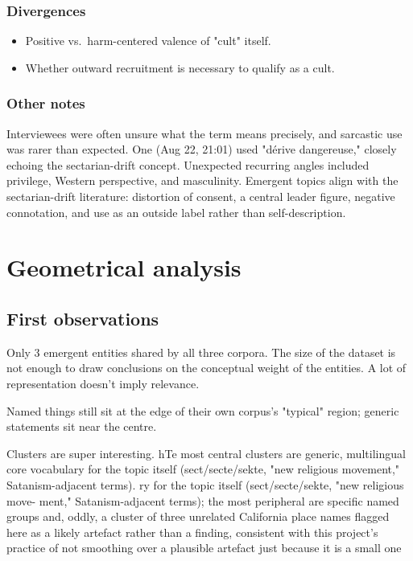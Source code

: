 \subsubsection{Divergences}
\begin{itemize}
  \item Positive vs.\ harm-centered valence of "cult" itself.
  \item Whether outward recruitment is necessary to qualify as a cult.
\end{itemize}

\subsubsection{Other notes}
Interviewees were often unsure what the term means precisely, and sarcastic use was rarer than expected. One (Aug 22, 21:01) used "dérive dangereuse," closely echoing the sectarian-drift concept. Unexpected recurring angles included privilege, Western perspective, and masculinity. Emergent topics align with the sectarian-drift literature: distortion of consent, a central leader figure, negative connotation, and use as an outside label rather than self-description.


\section{Geometrical analysis}

\subsection{First observations}
Only 3 emergent entities shared by all three corpora. The size of the dataset is not enough to draw conclusions on the conceptual weight of the entities. A lot of representation doesn't imply relevance.

Named things still sit at the edge of their own corpus’s "typical" region; generic
statements sit near the centre.

Clusters are super interesting. hTe most central clusters are generic, multilingual core vocabulary for the topic itself (sect/secte/sekte, "new religious movement," Satanism-adjacent terms). ry for the topic itself (sect/secte/sekte, "new religious move-
ment," Satanism-adjacent terms); the most peripheral are specific named groups and, oddly,
a cluster of three unrelated California place names flagged here as a likely artefact rather than a finding, consistent with this project’s practice of not smoothing over a plausible artefact just because it is a small one



